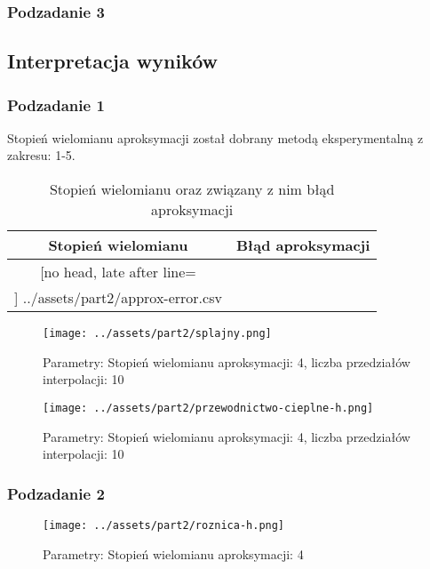 \documentclass[
	12pt, %
]{fphw}
\begin{document}





\subsubsection{Podzadanie 3}


\subsection{Interpretacja wyników}
\subsubsection{Podzadanie 1}
Stopień wielomianu aproksymacji został dobrany metodą eksperymentalną z zakresu: 1-5.

\begin{table}[H]
	\centering
	\begin{tabular}{|c|c|}\hline%
	Stopień wielomianu & Błąd aproksymacji \\\hline
	\csvreader[no head, late after line=\\\hline]%
	{../assets/part2/approx-error.csv}{}%
	{\thecsvrow&\csvcoli}%
	\end{tabular}
	\caption{Stopień wielomianu oraz związany z nim błąd aproksymacji}
	\label{tab:approx-error}
\end{table}

\begin{figure}[H]
	\texttt{[image: ../assets/part2/splajny.png]}
	\caption{Parametry: Stopień wielomianu aproksymacji: 4, liczba przedziałów interpolacji: 10}

	\texttt{[image: ../assets/part2/przewodnictwo-cieplne-h.png]}
	\caption{Parametry: Stopień wielomianu aproksymacji: 4, liczba przedziałów interpolacji: 10}
	\label{fig:przewodnictwo-h}
\end{figure}

\subsubsection{Podzadanie 2}
\begin{figure}[H]
	\texttt{[image: ../assets/part2/roznica-h.png]}
	\caption{Parametry: Stopień wielomianu aproksymacji: 4}
	\label{fig:roznica-h}
\end{figure}
\end{document}
